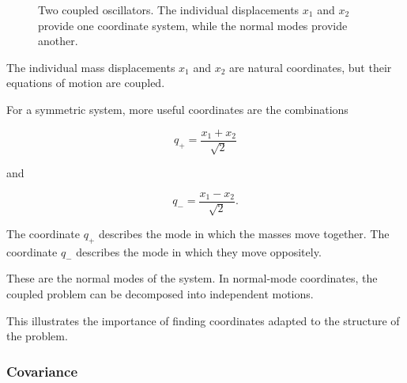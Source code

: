 \begin{figure}[h!]
\centering
{}
\caption{Two coupled oscillators.
The individual displacements $x_1$ and $x_2$ provide one coordinate system, while the normal modes provide another.}
\end{figure}

The individual mass displacements $x_1$ and $x_2$ are natural coordinates, but their equations of motion are coupled.

For a symmetric system, more useful coordinates are the combinations

\begin{equation}
    q_{+}=\frac{x_1+x_2}{\sqrt{2}}
\end{equation}

and

\begin{equation}
    q_{-}=\frac{x_1-x_2}{\sqrt{2}}.
\end{equation}

The coordinate $q_{+}$ describes the mode in which the masses move together.
The coordinate $q_{-}$ describes the mode in which they move oppositely.

These are the normal modes of the system.
In normal-mode coordinates, the coupled problem can be decomposed into independent motions.

This illustrates the importance of finding coordinates adapted to the structure of the problem.


\subsubsection{Covariance}


